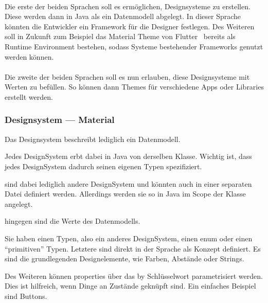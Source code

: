 \paragraph*{}
Die erste der beiden Sprachen soll es ermöglichen, Designsysteme zu erstellen.
Diese werden dann in Java als ein Datenmodell abgelegt.
In dieser Sprache könnten die Entwickler ein Framework für die Designer festlegen.
Des Weiteren soll in Zukunft zum Beispiel das Material Theme von Flutter~\autocite{google-ireland-limited-no-date} bereits als Runtime Environment bestehen, sodass Systeme bestehender Frameworks genutzt werden können.

\paragraph*{}
Die zweite der beiden Sprachen soll es nun erlauben, diese Designsysteme mit Werten zu befüllen.
So können dann Themes für verschiedene Apps oder Libraries erstellt werden.

\subsubsection{Designsystem --- Material}
Das Designsystem beschreibt lediglich ein Datenmodell.

Jedes {\ttfamily DesignSystem} erbt dabei in Java von derselben Klasse.
Wichtig ist, dass jedes {\ttfamily DesignSystem} dadurch seinen eigenen Typen spezifiziert.

 sind dabei lediglich andere {\ttfamily DesignSystem} und könnten auch in einer separaten Datei definiert werden.
Allerdings werden sie so in Java im Scope der Klasse angelegt.

 hingegen sind die Werte des Datenmodells.

Sie haben einen Typen, also ein anderes {\ttfamily DesignSystem}, einen {\ttfamily enum} oder einen \enquote{primitiven} Typen.
Letztere sind direkt in der Sprache als Konzept definiert.
Es sind die grundlegenden Designelemente, wie Farben, Abstände oder Strings.

Des Weiteren können {\ttfamily properties} über das {\ttfamily by} Schlüsselwort parametrisiert werden.
Dies ist hilfreich, wenn Dinge an Zustände geknüpft sind.
Ein einfaches Beispiel sind Buttons.

